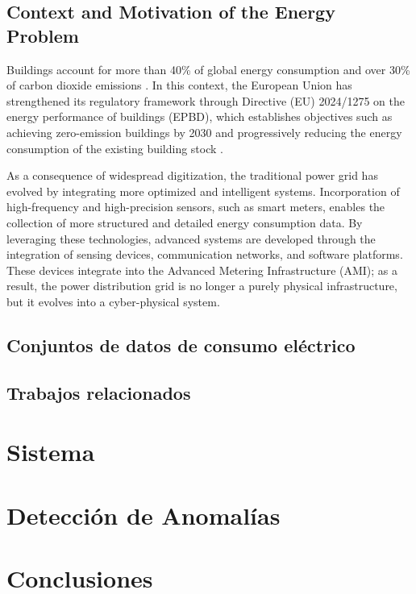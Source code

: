 \documentclass[12pt]{report} %
\begin{document}
\section{Context and Motivation of the Energy Problem}

Buildings account for more than 40\% of global energy consumption and over 30\% of carbon dioxide emissions \cite{Himeur2021}. In this context, the European Union has strengthened its regulatory framework through Directive (EU) 2024/1275 on the energy performance of buildings (EPBD), which establishes objectives such as achieving zero-emission buildings by 2030 and progressively reducing the energy consumption of the existing building stock \cite{EPBD2024}.

As a consequence of widespread digitization, the traditional power grid has evolved by integrating more optimized and intelligent systems. Incorporation of high-frequency and high-precision sensors, such as smart meters, enables the collection of more structured and detailed energy consumption data. By leveraging these technologies, advanced systems are developed through the integration of sensing devices, communication networks, and software platforms. These devices integrate into the Advanced Metering Infrastructure (AMI); as a result, the power distribution grid is no longer a purely physical infrastructure, but it evolves into a cyber-physical system\cite{Ahmad2025}. 

\section{Conjuntos de datos de consumo eléctrico}
\section{Trabajos relacionados}

\chapter{Sistema}

\chapter{Detección de Anomalías}

\chapter{Conclusiones}
\end{document}
